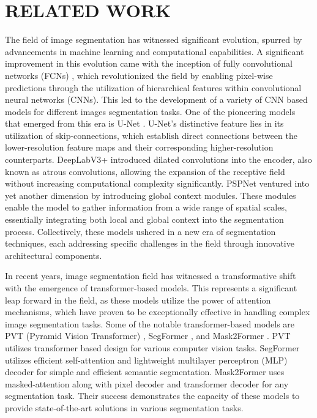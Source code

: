 \documentclass{article}
\begin{document}
\section{RELATED WORK}
\label{sec:related-work}

The field of image segmentation has witnessed significant evolution, spurred by advancements in machine learning and computational capabilities. A significant improvement in this evolution came with the inception of fully convolutional networks (FCNs) \cite{long2015FCN, wu2019fastfcn}, which revolutionized the field by enabling pixel-wise predictions through the utilization of hierarchical features within convolutional neural networks (CNNs). This led to the development of a variety of CNN based models for different images segmentation tasks. One of the pioneering models that emerged from this era is U-Net \cite{ronneberger2015unet}. U-Net's distinctive feature lies in its utilization of skip-connections, which establish direct connections between the lower-resolution feature maps and their corresponding higher-resolution counterparts. DeepLabV3+ \cite{chen2018deeplabv3+} introduced dilated convolutions into the encoder, also known as atrous convolutions, allowing the expansion of the receptive field without increasing computational complexity significantly. PSPNet \cite{zhao2017pspnet} ventured into yet another dimension by introducing global context modules. These modules enable the model to gather information from a wide range of spatial scales, essentially integrating both local and global context into the segmentation process. Collectively, these models ushered in a new era of segmentation techniques, each addressing specific challenges in the field through innovative architectural components. 

In recent years, image segmentation field has witnessed a transformative shift with the emergence of transformer-based models. This represents a significant leap forward in the field, as these models utilize the power of attention mechanisms, which have proven to be exceptionally effective in handling complex image segmentation tasks. Some of the notable transformer-based models are PVT (Pyramid Vision Transformer) \cite{wang2021pvt}, SegFormer \cite{xie2021segformer}, and Mask2Former \cite{cheng2022mask2former}. PVT utilizes transformer based design for various computer vision tasks. SegFormer utilizes efficient self-attention and lightweight multilayer perceptron (MLP) decoder for simple and efficient semantic segmentation. Mask2Former uses masked-attention along with pixel decoder and transformer decoder for any segmentation task. Their success demonstrates the capacity of these models to provide state-of-the-art solutions in various segmentation tasks.
\end{document}
